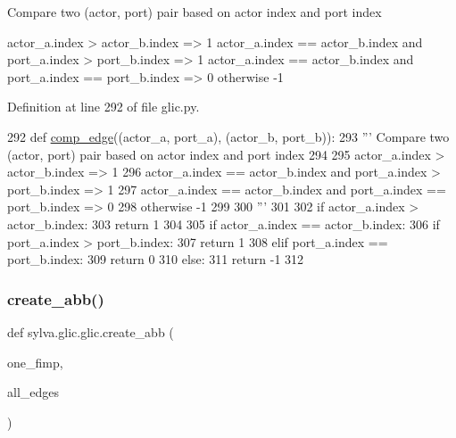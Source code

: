 \begin{DoxyVerb}Compare two (actor, port) pair based on actor index and port index

  actor_a.index > actor_b.index => 1
  actor_a.index == actor_b.index and port_a.index > port_b.index => 1
  actor_a.index == actor_b.index and port_a.index == port_b.index => 0
  otherwise -1\end{DoxyVerb}
 

Definition at line 292 of file glic.\+py.


\begin{DoxyCode}
292     \textcolor{keyword}{def }\hyperlink{namespacesylva_1_1glic_1_1glic_aa441c66a03eed575ba427151f3567a0e}{comp\_edge}((actor\_a, port\_a), (actor\_b, port\_b)):
293         \textcolor{stringliteral}{''' Compare two (actor, port) pair based on actor index and port index}
294 \textcolor{stringliteral}{}
295 \textcolor{stringliteral}{          actor\_a.index > actor\_b.index => 1}
296 \textcolor{stringliteral}{          actor\_a.index == actor\_b.index and port\_a.index > port\_b.index => 1}
297 \textcolor{stringliteral}{          actor\_a.index == actor\_b.index and port\_a.index == port\_b.index => 0}
298 \textcolor{stringliteral}{          otherwise -1}
299 \textcolor{stringliteral}{}
300 \textcolor{stringliteral}{        '''}
301 
302         \textcolor{keywordflow}{if} actor\_a.index > actor\_b.index:
303             \textcolor{keywordflow}{return} 1
304 
305         \textcolor{keywordflow}{if} actor\_a.index == actor\_b.index:
306             \textcolor{keywordflow}{if} port\_a.index > port\_b.index:
307                 \textcolor{keywordflow}{return} 1
308             \textcolor{keywordflow}{elif} port\_a.index == port\_b.index:
309                 \textcolor{keywordflow}{return} 0
310             \textcolor{keywordflow}{else}:
311                 \textcolor{keywordflow}{return} -1
312 
\end{DoxyCode}
\mbox{\label{namespacesylva_1_1glic_1_1glic_a3a984424c11a0b4b6ac8890135ccbfe9}} 
\subsubsection{\texorpdfstring{create\+\_\+abb()}{create\_abb()}}
{\footnotesize\ttfamily def sylva.\+glic.\+glic.\+create\+\_\+abb (\begin{DoxyParamCaption}\item[{}]{one\+\_\+fimp,  }\item[{}]{all\+\_\+edges }\end{DoxyParamCaption})}



